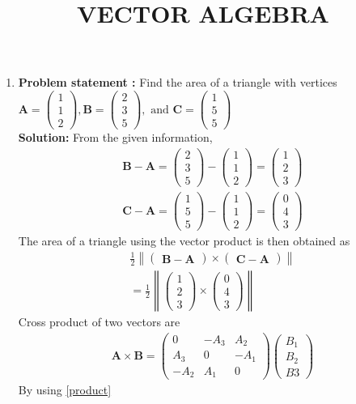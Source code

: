 \documentclass[12pt]{article}\usepackage{graphicx}
\title{\mytitle}
\newcommand{\myvec}[1]{\ensuremath{\begin{pmatrix}#1\end{pmatrix}}}
\let\vec\mathbf
\let\vec\mathbf
\providecommand{\norm}[1]{\left\lVert#1\right\rVert}
\newcommand{\solution}{\noindent \textbf{Solution: }}
\begin{document}
\begin{center}
\title{\textbf{VECTOR ALGEBRA}}
\maketitle
\end{center}
\begin{enumerate}
\item\textbf{Problem statement :} Find the area of a triangle with vertices
$
\vec{A} = \myvec{1\\1 \\2},
\vec{B} = \myvec{2\\3 \\5}, \text{ and }
\vec{C} = \myvec{1\\ 5\\5}
$
\\
\solution
From the given information, 
\begin{align}
\vec{B-A}=\myvec{2\\3\\5}-\myvec{1\\1\\2} = \myvec{1\\2\\3}\\
\vec{C-A}=\myvec{1\\5\\5}-\myvec{1\\1\\2}=\myvec{0\\4\\3}
\end{align}
The area of a triangle using the vector product is then obtained as
\begin{align}
        \frac{1}{2}\norm{\myvec{\vec{B-A}}\times\myvec{\vec{C-A}}} \\=\frac{1}{2}\norm{\myvec{1\\2\\3}\times \myvec{0\\4\\3}}
    \end{align}
Cross product of two vectors are  
 \begin{align}
      \vec{A}\times\vec{B} =\myvec{0&-A_3&A_2\\A_3&0&-A_1\\-A_2&A_1&0}\myvec{B_1\\B_2\\B3}
      \label{product}
\end{align}
By using \eqref{product}
\begin{align}

\end{align}
\end{enumerate}
\end{document}
